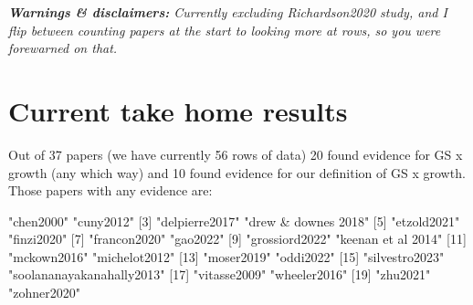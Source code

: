 \documentclass[11pt]{article}
\begin{document}
\renewcommand{\refname}{\CHead{}}

\iffalse
\title{Do growing season length and growth relate? \\ And if not, why not? \\ And if we're not sure, why is that?}
\author{Team Grephon}
\date{\today}
\maketitle
\fi 
\emph{{\bf Warnings \& disclaimers:}
Currently excluding Richardson2020 study, and I flip between counting papers at the start to looking more at rows, so you were forewarned on that. }

\section{Current take home results}


Out of 37 papers (we have currently 56 rows of data) 20 found evidence for GS x growth (any which way) and  10 found evidence for our definition of GS x growth. Those papers with any evidence are:

\begin{Schunk}
\begin{Soutput}
 [1] "chen2000"                 "cuny2012"                
 [3] "delpierre2017"            "drew & downes 2018"      
 [5] "etzold2021"               "finzi2020"               
 [7] "francon2020"              "gao2022"                 
 [9] "grossiord2022"            "keenan et al 2014"       
[11] "mckown2016"               "michelot2012"            
[13] "moser2019"                "oddi2022"                
[15] "silvestro2023"            "soolananayakanahally2013"
[17] "vitasse2009"              "wheeler2016"             
[19] "zhu2021"                  "zohner2020"              
\end{Soutput}
\end{Schunk}
\end{document}
